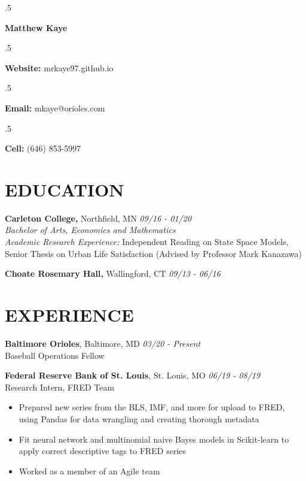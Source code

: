 \documentclass[margin, 10pt]{res} %
\begin{document}
\singlespacing

\moveleft.5\hoffset\centerline{\LARGE\bf Matthew Kaye} %
\medskip
\moveleft.5\hoffset\centerline{\textbf{Website:} mrkaye97.github.io}
\moveleft.5\hoffset\centerline{\textbf{Email:} mkaye@orioles.com}
\moveleft.5\hoffset\centerline{\textbf{Cell:} (646) 853-5997}


\begin{resume}


\section{EDUCATION}

{\sl} \textbf{Carleton College,} Northfield, MN \hfill \textit{09/16 - 01/20}\smallskip\\
{\sl Bachelor of Arts, Economics and Mathematics} \smallskip\\
{\sl Academic Research Experience: } Independent Reading on State Space Models, Senior Thesis on Urban Life Satisfaction (Advised by Professor Mark Kanazawa)

{\sl} \textbf{Choate Rosemary Hall,} Wallingford, CT \hfill \textit{09/13 -  06/16}

\section{EXPERIENCE}

{\sl} \textbf{Baltimore Orioles}, Baltimore, MD \hfill \textit{03/20 - Present}\\
{\sl} Baseball Operations Fellow \smallskip

{\sl} \textbf{Federal Reserve Bank of St. Louis}, St. Louis, MO \hfill \textit{06/19 - 08/19}\\
{\sl} Research Intern, FRED Team \smallskip
{\sl} \begin{itemize}
	\item Prepared new series from the BLS, IMF, and more for upload to FRED, using Pandas for data wrangling and creating thorough metadata
	\item Fit neural network and multinomial naive Bayes models in Scikit-learn to apply correct descriptive tags to FRED series
	\item Worked as a member of an Agile team
\end{itemize}


\end{resume}
\end{document}
